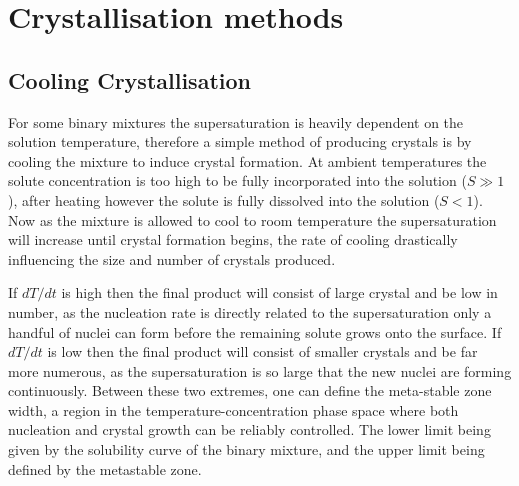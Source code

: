 \section{Crystallisation methods}
\subsection{Cooling Crystallisation}
For some binary mixtures the supersaturation is heavily dependent on 
the solution temperature, therefore a simple method of producing crystals 
is by cooling the mixture to induce crystal formation. At ambient 
temperatures the solute concentration is too high to be fully incorporated
into the solution ($S\gg 1$), after heating however the solute is fully dissolved
into the solution ($S<1$). Now as the mixture is allowed to cool to room
temperature the supersaturation will increase until crystal formation begins,
the rate of cooling drastically influencing the size and number of crystals
produced.

If $dT/dt$ is high then the final product will consist of large 
crystal and be low in number, as the nucleation rate is directly related
to the supersaturation only a handful of nuclei can form before the remaining
solute grows onto the surface. If $dT/dt$ is low then the final product will 
consist of smaller crystals and be far more numerous, as the supersaturation 
is so large that the new nuclei are forming continuously. Between these two 
extremes, one can define the meta-stable zone width, a region in the 
temperature-concentration phase space where both nucleation and crystal growth
can be reliably controlled. The lower limit being given by the solubility curve
of the binary mixture, and the upper limit being defined by the metastable zone.

